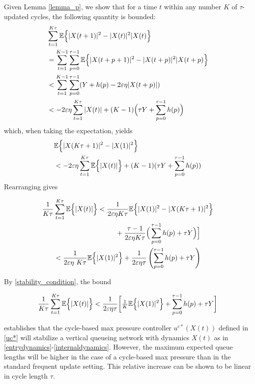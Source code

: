Given Lemma \ref{lemma_p}, we show that for a time $t$ within any number $K$ of $\tau$-updated cycles, the following quantity is bounded:
\begin{align} \nonumber 
&\sum_{t = 1}^{K \tau} \expectation{\vert X(t + 1)\vert^2 - \vert X(t)\vert^2 \vert X(t)}\\ \nonumber
&=\sum_{t=1}^{K-1} \sum_{p=0 }^{\tau - 1} \expectation{\vert X(t + p + 1)\vert^2 - \vert X(t + p)\vert^2 \vert X(t + p)}\\ \nonumber
&< \sum_{t=1}^{K-1} \sum_{p=0 }^{\tau - 1} (Y+ h(p) -2\varepsilon\eta \vert X(t + p )\vert ) \\
&< -2\varepsilon \eta \sum_{t=1}^{K \tau} \vert X(t )\vert  + (K - 1) \Big(\tau Y+\sum_{p=0 }^{\tau - 1} h(p) \Big) \label{equivalencestabcycleMP}
\end{align}
which, when taking the expectation, yields
\begin{align} \nonumber 
& \mathbb{E}\Big\{ \vert X(K \tau + 1)\vert^2 - \vert X(1)\vert^2  \Big\} \\
& <  -2\varepsilon\eta \sum_{t=1}^{K \tau} \mathbb{E}\Big\{ \vert X(t )\vert \Big\}+ (K - 1) ( \tau Y+\sum_{p=0 }^{\tau - 1} h(p) )
\end{align}
Rearranging gives
\begin{small}
\begin{align} \nonumber 
\dfrac{1}{K \tau}& \sum_{t=1}^{K \tau}  \expectation{\vert X(t )\vert} < \frac{1}{2\varepsilon\eta K \tau} \expectation{\vert X(1)\vert^2 - \vert X(K \tau + 1)\vert^2  } \\
&  \qquad \qquad \qquad \qquad \quad + \frac{\tau-1}{2\varepsilon\eta K\tau }   \Big(\sum_{p=0 }^{\tau - 1} h(p) + \tau Y \Big) \Big] \\
&< \dfrac{1}{2\varepsilon\eta\ K \tau}\expectation{\vert X( 1)\vert^2} + \dfrac{ 1}{2\varepsilon\eta \tau} \left(\sum_{p=0 }^{\tau - 1} h(p) + \tau Y\right) \label{finalbound}
\end{align}
\end{small}
By \eqref{stability_condition}, the bound 
\begin{small}
\begin{equation*} \label{CYCLE_BOUNDS} 
\dfrac{1}{K \tau} \sum_{t=1}^{K \tau}  \expectation{\vert X(t )\vert} <  \frac{1}{2\varepsilon\eta \tau }\bigg[ \tfrac{1}{K} \expectation{\vert X( 1)\vert^2} +  \sum_{p=0 }^{\tau - 1} h(p) + \tau Y  \bigg]
\end{equation*}
\end{small}establishes that the cycle-based max pressure controller $u^{c*}(X(t))$ defined in \eqref{uc*} will stabilize a vertical queueing network with dynamics $X(t)$ as in \eqref{entrydynamics}-\eqref{internaldynamics}. However, the maximum expected queue lengths will be higher in the case of a cycle-based max pressure than in the standard frequent update setting. This relative increase can be shown to be linear in cycle length $\tau$. 
